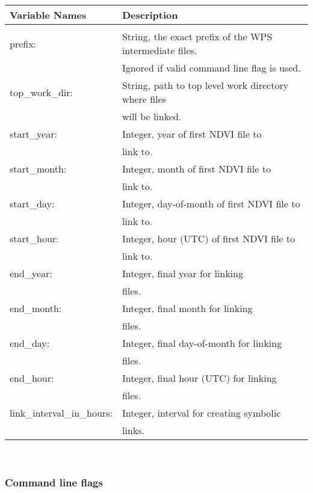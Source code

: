 \documentclass{article}
\begin{document}
\begin{tabular}{|l|l|} \hline
Variable Names          & Description \\ \hline
[LINK\_WPS\_INT]        & \\ \hline
prefix:         & String, the exact prefix of the WPS intermediate files.\\
                & Ignored if valid command line flag is used. \\ \hline
top\_work\_dir: & String, path to top level work directory where files \\
                & will be linked. \\ \hline
start\_year:            & Integer, year of first NDVI file to \\
                        & link to. \\ \hline
start\_month:           & Integer, month of first NDVI file to \\
                        & link to. \\ \hline
start\_day:             & Integer, day-of-month of first NDVI file to \\
                        & link to. \\ \hline
start\_hour:            & Integer, hour (UTC) of first NDVI file to \\
                        & link to. \\ \hline
end\_year:              & Integer, final year for linking \\ 
                        & files. \\ \hline
end\_month:             & Integer, final month for linking \\
                        & files. \\ \hline
end\_day:               & Integer, final day-of-month for linking \\
                        & files. \\ \hline
end\_hour:              & Integer, final hour (UTC) for linking \\
                        & files. \\ \hline
link\_interval\_in\_hours: & Integer, interval for creating symbolic \\
                        & links. \\ \hline
\end{tabular} \\

\subsubsection{Command line flags}
\label{subsubsec:LinkWpsCmdLineFlags}
\end{document}

